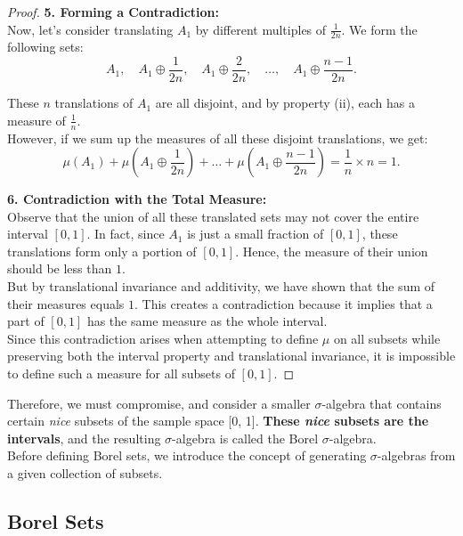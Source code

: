 \begin{proof}
\textbf{5. Forming a Contradiction:}  \\

   Now, let’s consider translating $A_1$ by different multiples of $\frac{1}{2n}$. We form the following sets:
   \[
   A_1, \quad A_1 \oplus \frac{1}{2n}, \quad A_1 \oplus \frac{2}{2n}, \quad \ldots, \quad A_1 \oplus \frac{n-1}{2n}.
   \]
   
   These $n$ translations of $A_1$ are all disjoint, and by property (ii), each has a measure of $\frac{1}{n}$.\\

   However, if we sum up the measures of all these disjoint translations, we get:
   \[
   \mu(A_1) + \mu(A_1 \oplus \frac{1}{2n}) + \ldots + \mu(A_1 \oplus \frac{n-1}{2n}) = \frac{1}{n} \times n = 1.
   \]

\textbf{6. Contradiction with the Total Measure:}  \\

   Observe that the union of all these translated sets may not cover the entire interval $[0, 1]$. In fact, since $A_1$ is just a small fraction of $[0, 1]$, these translations form only a portion of $[0, 1]$. Hence, the measure of their union should be less than $1$.\\

   But by translational invariance and additivity, we have shown that the sum of their measures equals $1$. This creates a contradiction because it implies that a part of $[0, 1]$ has the same measure as the whole interval.\\

   Since this contradiction arises when attempting to define $\mu$ on all subsets while preserving both the interval property and translational invariance, it is impossible to define such a measure for all subsets of $[0, 1]$. 
\end{proof}

Therefore, we must compromise, and consider a smaller $\sigma$-algebra that contains certain \textit{nice} subsets of the sample space [0, 1]. \textbf{These \textit{nice} subsets are the intervals}, and the resulting $\sigma$-algebra is called the Borel $\sigma$-algebra.\\

Before defining Borel sets, we introduce the concept of generating $\sigma$-algebras from a given collection of subsets.

\subsection{Borel Sets}

